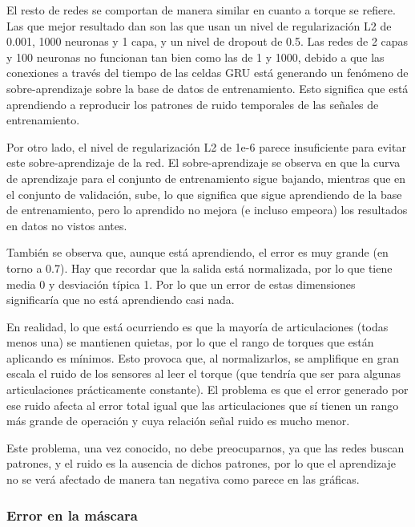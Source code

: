 El resto de redes se comportan de manera similar en cuanto a torque se refiere. Las que mejor resultado dan son las que usan un nivel de regularización L2 de 0.001, 1000 neuronas y 1 capa, y un nivel de dropout de 0.5. Las redes de 2 capas y 100 neuronas no funcionan tan bien como las de 1 y 1000, debido a que las conexiones a través del tiempo de las celdas GRU está generando un fenómeno de sobre-aprendizaje sobre la base de datos de entrenamiento. Esto significa que está aprendiendo a reproducir los patrones de ruido temporales de las señales de entrenamiento.

Por otro lado, el nivel de regularización L2 de 1e-6 parece insuficiente para evitar este sobre-aprendizaje de la red. El sobre-aprendizaje se observa en que la curva de aprendizaje para el conjunto de entrenamiento sigue bajando, mientras que en el conjunto de validación, sube, lo que significa que sigue aprendiendo de la base de entrenamiento, pero lo aprendido no mejora (e incluso empeora) los resultados en datos no vistos antes.

También se observa que, aunque está aprendiendo, el error es muy grande (en torno a 0.7). Hay que recordar que la salida está normalizada, por lo que tiene media 0 y desviación típica 1. Por lo que un error de estas dimensiones significaría que no está aprendiendo casi nada.

En realidad, lo que está ocurriendo es que la mayoría de articulaciones (todas menos una) se mantienen quietas, por lo que el rango de torques que están aplicando es mínimos. Esto provoca que, al normalizarlos, se amplifique en gran escala el ruido de los sensores al leer el torque (que tendría que ser para algunas articulaciones prácticamente constante). El problema es que el error generado por ese ruido afecta al error total igual que las articulaciones que sí tienen un rango más grande de operación y cuya relación señal ruido es mucho menor.

Este problema, una vez conocido, no debe preocuparnos, ya que las redes buscan patrones, y el ruido es la ausencia de dichos patrones, por lo que el aprendizaje no se verá afectado de manera tan negativa como parece en las gráficas.

\subsubsection{Error en la máscara}

